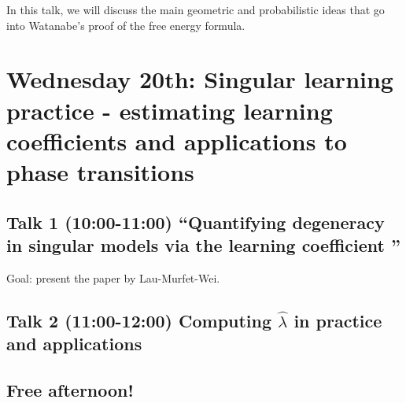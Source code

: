 \documentclass[a4paper,11pt]{amsart}
\newcommand{\lambdahat}{\widehat{\lambda}}
\begin{document}
In this talk, we will discuss the main geometric and probabilistic ideas that go into Watanabe's proof of the free energy formula.

\section*{Wednesday 20th: Singular learning practice - estimating learning coefficients and applications to phase transitions}

\subsection*{Talk 1 (10:00-11:00) ``Quantifying degeneracy in singular models via the learning coefficient ''}

Goal: present the paper \cite{lambdahat} by Lau-Murfet-Wei.

\subsection*{Talk 2 (11:00-12:00) Computing $\lambdahat$ in practice and applications}

\subsection*{Free afternoon!}






\end{document}
